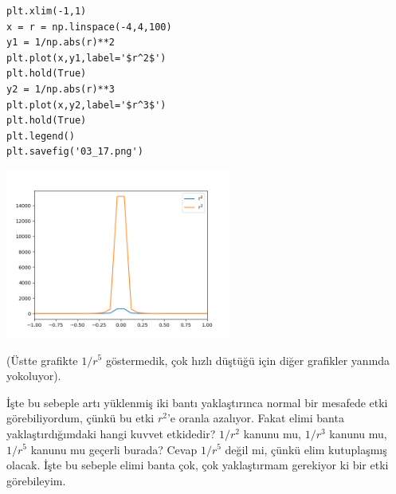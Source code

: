 \documentclass[12pt,fleqn]{article}\usepackage{../../common}
\begin{document}
\begin{verbatim}
plt.xlim(-1,1)
x = r = np.linspace(-4,4,100)
y1 = 1/np.abs(r)**2
plt.plot(x,y1,label='$r^2$')
plt.hold(True)
y2 = 1/np.abs(r)**3
plt.plot(x,y2,label='$r^3$')
plt.hold(True)
plt.legend()
plt.savefig('03_17.png')
\end{verbatim}

\includegraphics[width=20em]{03_17.png}

(Üstte grafikte $1/r^5$ göstermedik, çok hızlı düştüğü için diğer grafikler
yanında yokoluyor).

İşte bu sebeple artı yüklenmiş iki bantı yaklaştırınca normal bir mesafede etki
görebiliyordum, çünkü bu etki $r^2$'e oranla azalıyor. Fakat elimi banta
yaklaştırdığımdaki hangi kuvvet etkidedir? $1/r^2$ kanunu mu, $1/r^3$ kanunu mu,
$1/r^5$ kanunu mu geçerli burada? Cevap $1/r^5$ değil mi, çünkü elim kutuplaşmış
olacak. İşte bu sebeple elimi banta çok, çok yaklaştırmam gerekiyor ki bir etki
görebileyim. 
\end{document}
